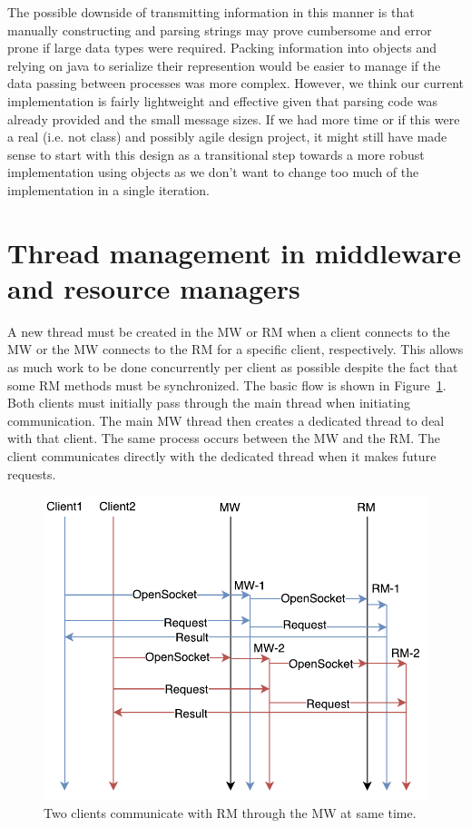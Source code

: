 \documentclass{article}
\begin{document}
The possible downside of transmitting information in this manner is that manually constructing and parsing strings may prove cumbersome and error prone if large data types were required. 
Packing information into objects and relying on java to serialize their represention would be easier to manage if the data passing between processes was more complex. 
However, we think our current implementation is fairly lightweight and effective given that parsing code was already provided and the small message sizes. 
If we had more time or if this were a real (i.e. not class) and possibly agile design project, it might still have made sense to start with this design as a transitional step towards a more robust implementation using objects as we don't want to change too much of the implementation in a single iteration. 
 



\section{Thread management in middleware and resource managers}

A new thread must be created in the MW or RM when a client connects to the MW or the MW connects to the RM for a specific client, respectively. This allows as much work to be done concurrently per client as possible despite the fact that some RM methods must be synchronized. The basic flow is shown in Figure~\ref{f:threads}. Both clients must initially pass through the main thread when initiating communication. The main MW thread then creates a dedicated thread to deal with that client. The same process occurs between the MW and the RM. The client communicates directly with the dedicated thread when it makes future requests.

\begin{figure}
\centering
\includegraphics[scale=1]{figures/threads.pdf}
\caption{Two clients communicate with RM through the MW at same time.}
\label{f:threads}
\end{figure} 
\end{document}
